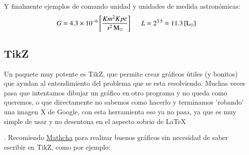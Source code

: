 \documentclass[11pt,letterpaper]{article}
\DeclareMathOperator{\lsol}{L_\odot}               %
\DeclareMathOperator{\msol}{M_\odot}               %
\newcommand{\units}[1]{\left[ #1 \right]}          %
\begin{document}
\begin{multicols}{2}
Y finalmente ejemplos de comando unidad y unidades de medida astronómicas:
\begin{equation*}
    G = 4.3\times10^{-6}\units{\frac{Km^2Kpc}{s^2\msol}} \hspace{0.5cm} L = 2^{3.5} = 11.3 \units{\lsol}
\end{equation*}

\subsection*{TikZ}
Un paquete muy potente es TikZ, que permite crear gráficos útiles (y bonitos) que ayudan al entendimiento del problema que se esta resolviendo. Muchas veces pasa que intentamos dibujar un gráfico en otro programa y no queda como queremos, o que directamente no sabemos como hacerlo y terminamos 'robando' una imagen X de Google, con esta herramienta eso ya no pasa, ya que es muy simple de usar y no desentona en el aspecto sobrio de \LaTeX\par.
Recomiendo \href{https://www.mathcha.io/}{Mathcha} para realizar buenos gráficos sin necesidad de saber escribir en TikZ, como por ejemplo:
\end{multicols}
\end{document}
